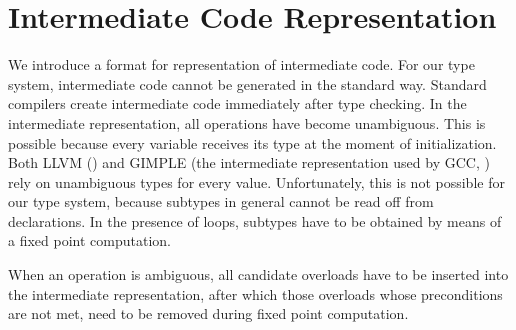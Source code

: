 
\section{Intermediate Code Representation} 
\label{Sect_intermediate}

We introduce a format for representation of intermediate code.
For our type system, intermediate code cannot be generated in the
standard way.
Standard compilers create intermediate code immediately
after type checking. In the intermediate representation, all operations
have become unambiguous. This is possible because every variable
receives its type at the moment of initialization. 
Both LLVM (\cite{LLVM2004}) and GIMPLE (the intermediate representation
used by GCC, \cite{GIMPLE}) rely on unambiguous types for every value.
Unfortunately, this is not possible for our type system, 
because subtypes in general cannot be read off from declarations.
In the presence of loops, subtypes have to be obtained by means
of a fixed point computation. 

When an operation is ambiguous, all candidate overloads have to 
be inserted into the intermediate representation, after which 
those overloads whose preconditions are not met, need to be removed during
fixed point computation. 

